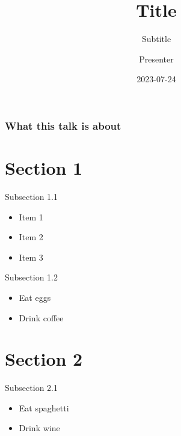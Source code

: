 \documentclass[
  10pt,
  ignorenonframetext,
  aspectratio=169,
xcolor = dvipsnames
]{beamer}
\title{Title}
\subtitle{Subtitle}
\author{Presenter}
\date{2023-07-24}
\institute{Institute}
\providecommand{\tightlist}{%
  \setlength{\itemsep}{0pt}\setlength{\parskip}{0pt}}
\begin{document}
\begin{frame}[plain]{}
  \titlepage
\end{frame}

\begin{frame}
  \frametitle{What this talk is about}
  \tableofcontents
\end{frame}
\hypertarget{section-1}{%
\section{Section 1}\label{section-1}}

\begin{frame}{Subsection 1.1}
\protect\hypertarget{subsection-1.1}{}
\begin{itemize}
\tightlist
\item
  Item 1
\item
  Item 2
\item
  Item 3
\end{itemize}
\end{frame}

\begin{frame}{Subsection 1.2}
\protect\hypertarget{subsection-1.2}{}
\begin{itemize}
\tightlist
\item
  Eat eggs
\item
  Drink coffee
\end{itemize}
\end{frame}

\hypertarget{section-2}{%
\section{Section 2}\label{section-2}}

\begin{frame}{Subsection 2.1}
\protect\hypertarget{subsection-2.1}{}
\begin{itemize}
\tightlist
\item
  Eat spaghetti
\item
  Drink wine
\end{itemize}
\end{frame}
\end{document}
